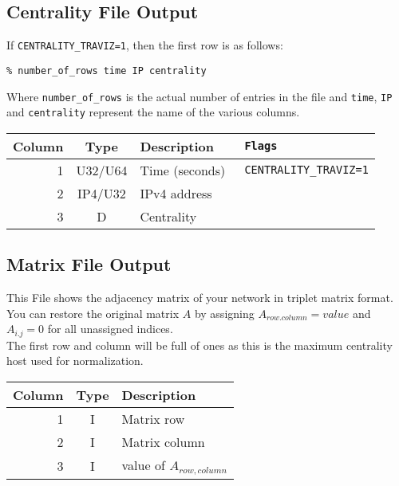 \documentclass[documentation]{subfiles}
\begin{document}
\subsection{Centrality File Output}

If {\tt CENTRALITY\_TRAVIZ=1}, then the first row is as follows:
\begin{center}
    {\tt \% number\_of\_rows time IP centrality}
\end{center}
Where {\tt number\_of\_rows} is the actual number of entries in the file and {\tt time}, {\tt IP} and {\tt centrality} represent the name of the various columns.
\begin{center}
    \begin{tabular}{rcl>{\tt\small}l}
        \toprule
        {\bf Column} & {\bf Type} & {\bf Description} & {\bf Flags}\\
        \midrule
        1 & U32/U64 & Time (seconds) & CENTRALITY\_TRAVIZ=1\\
        2 & IP4/U32 & IPv4 address   & \\
        3 & D       & Centrality     & \\
        \bottomrule
    \end{tabular}
\end{center}

%
%

\subsection{Matrix File Output}

This File shows the adjacency matrix of your network in triplet matrix format. You can restore the original matrix $A$ by assigning $A_{row.column}=value$ and $A_{i.j}=0$ for all unassigned indices.\\
The first row and column will be full of ones as this is the maximum centrality host used for normalization.

\begin{center}
    \begin{tabular}{rcl}
        \toprule
        {\bf Column} & {\bf Type} & {\bf Description}\\
        \midrule
        1 & I & Matrix row\\
        2 & I & Matrix column\\
        3 & I & value of $A_{row,column}$\\
        \bottomrule
    \end{tabular}
\end{center}
\end{document}
